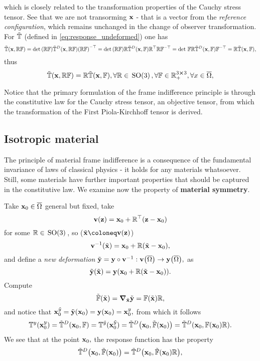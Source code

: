 \documentclass[11pt]{scrartcl} %
\begin{document}
which is closely related to the transformation properties of the Cauchy stress tensor. See that we are not transorming $\vb{x}$ - that is a vector from the \textit{reference configuration}, which remains unchanged in the change of observer transformation. For $\tilde{\mathbb{T}}$ (defined in \ref{eq:response_undeformed}) one has
\[
	\tilde{\mathbb{T}}\qty(\vb{x}, \mathbb{R} \mathbb{F}) = \det\qty(\mathbb{R} \mathbb{F}) \tilde{\mathbb{T}}^D\qty(\vb{x}, \mathbb{R}\mathbb{F})\qty(\mathbb{R} \mathbb{F})^{-\top} = \det\qty(\mathbb{R} \mathbb{F}) \mathbb{R} \tilde{\mathbb{T}}^D(\vb{x},\mathbb{F}) \mathbb{R}^\top \mathbb{R} \mathbb{F}^{-\top} = \det\, \mathbb{F} \mathbb{R}\tilde{\mathbb{T}}^D\qty(\vb{x},\mathbb{F})\mathbb{F}^{-\top}=\mathbb{R}\tilde{\mathbb{T}}\qty(\vb{x},\mathbb{F}),
\]
thus
\[
	\tilde{\mathbb{T}}\qty(\vb{x}, \mathbb{R} \mathbb{F}) = \mathbb{R}\tilde{\mathbb{T}}\qty(\vb{x},\mathbb{F}), \forall \mathbb{R} \in \, \text{SO(3)} \,, \forall \mathbb{F} \in {\mathbb R}^{3 \cross 3}_+, \forall x \in \overline{\Omega},
\]

Notice that the primary formulation of the frame indifference principle is through the constitutive law for the Cauchy stress tensor, an objective tensor, from which the transformation of the First Piola-Kirchhoff tensor is derived.

\subsection{Isotropic material}
\label{sec:isotropic_materials}
The principle of material frame indifference is a consequence of the fundamental invariance of laws of classical physics - it holds for any materials whatsoever. Still, some materials have further important properties that should be captured in the constitutive law. We examine now the property of \textbf{material symmetry}.

Take $\vb{x}_0 \in \overline{\Omega}$ general but fixed, take
\[
	\vb{v}\qty(\vb{z})=\vb{x}_0 + \mathbb{R}^\top\qty(\vb{z}-\vb{x}_0)
\]
for some $\mathbb{R} \in \, \text{SO(3)} \,$, so ($\tilde{\vb{x}} \coloneq \vb{v}\qty(\vb{z})$)
\[
	\vb{v}^{-1}\qty(\tilde{\vb{x}}) = \vb{x}_0 + \mathbb{R}\qty(\tilde{\vb{x}} - \vb{x}_0),
\]
and define a \textit{new deformation} $\tilde{\vb{y}}=\vb{y}\circ \vb{v}^{-1}: \vb{v}\qty(\overline{\Omega}) \to \vb{y}\qty(\overline{\Omega}), $ as
\[
	\tilde{\vb{y}}\qty(\tilde{\vb{x}})=\vb{y}\qty(\vb{x}_0+\mathbb{R}\qty(\tilde{\vb{x}}-\vb{x}_0)).
\]
Compute
\[
	\tilde{\mathbb{F}}\qty(\tilde{\vb{x}}) = \grad_{\tilde{\vb{x}}} \tilde{\vb{y}} = \mathbb{F}\qty(\tilde{\vb{x}}) \mathbb{R},
\]
and notice that $\vb{x}_0^{\tilde{y}} = \tilde{\vb{y}}\qty(\vb{x}_0) = \vb{y}\qty(\vb{x}_0) = \vb{x}_0^{y},$ from which it follows
\[
	\mathbb{T}^y\qty(\vb{x}_0^{y})=\tilde{\mathbb{T}}^D\qty(\vb{x}_0, \mathbb{F})= \mathbb{T}^{\tilde{y}}(\vb{x}^{\tilde{y}}_0) = \tilde{\mathbb{T}}^D\qty(\vb{x}_0, \tilde{\mathbb{F}}\qty(\vb{x}_0)) = \tilde{\mathbb{T}}^D\qty(\vb{x}_0, \mathbb{F}\qty(\vb{x}_0) \mathbb{R}).
\]
We see that at the point $\vb{x}_0,$ the response function has the property
\[
	\tilde{\mathbb{T}}^D\qty(\vb{x}_0, \tilde{\mathbb{F}}\qty(\vb{x}_0)) = \tilde{\mathbb{T}}^D\qty(\vb{x}_0, \tilde{\mathbb{F}}\qty(\vb{x}_0)\mathbb{R}),
\]
\end{document}
